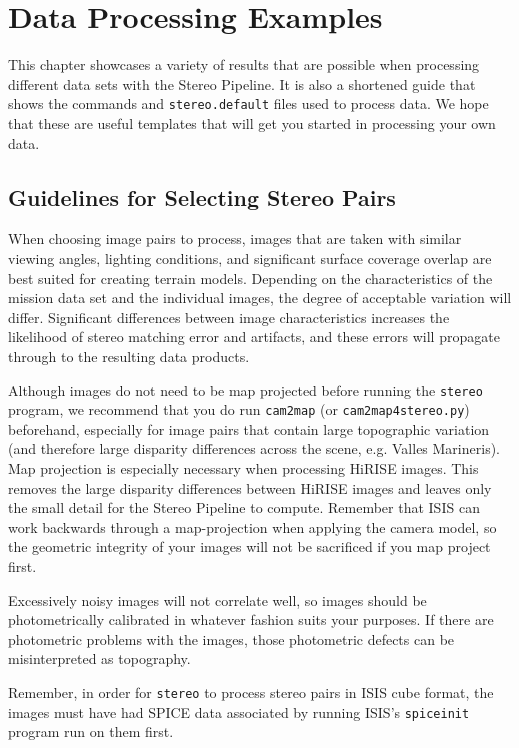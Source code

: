 \chapter{Data Processing Examples}
\label{ch:examples}


This chapter showcases a variety of results that are possible when
processing different data sets with the Stereo Pipeline. It is also
a shortened guide that shows the commands and \texttt{stereo.default}
files used to process data. We hope that these are useful templates
that will get you started in processing your own data.

\section{Guidelines for Selecting Stereo Pairs}

When choosing image pairs to process, images that are taken with
similar viewing angles, lighting conditions, and significant surface
coverage overlap are best suited for creating terrain
models. Depending on the characteristics of the mission data set and
the individual images, the degree of acceptable variation will
differ. Significant differences between image characteristics
increases the likelihood of stereo matching error and artifacts, and
these errors will propagate through to the resulting data products.

Although images do not need to be map projected before running the
\texttt{stereo} program, we recommend that you do run {\tt cam2map}
(or \texttt{cam2map4stereo.py})
beforehand, especially for image pairs that contain large topographic
variation (and therefore large disparity differences across the
scene, e.g. Valles Marineris).  Map projection is especially necessary
when processing \ac{HiRISE} images. This removes the large disparity
differences between \ac{HiRISE} images and leaves only the small
detail for the Stereo Pipeline to compute. Remember that \ac{ISIS}
can work backwards through a map-projection when applying the camera
model, so the geometric integrity of your images will not be sacrificed
if you map project first.

Excessively noisy images will not correlate well, so images should be
photometrically calibrated in whatever fashion suits your purposes. If
there are photometric problems with the images, those photometric
defects can be misinterpreted as topography.

Remember, in order for \texttt{stereo} to process stereo pairs in
\ac{ISIS} cube format, the images must have had SPICE data associated
by running ISIS's \texttt{spiceinit} program run on them first.

